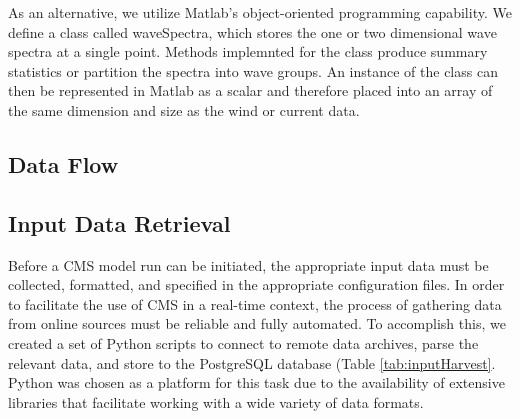 \documentclass[11pt,letterpaper,oneside,reqno]{article}
\begin{document}
As an alternative, we utilize Matlab's object-oriented programming
capability. We define a class called waveSpectra, which stores the
one or two dimensional wave spectra at a single point. Methods
implemnted for the class produce summary statistics or partition
the spectra into wave groups. An instance of the class can then be
represented in Matlab as a scalar and therefore placed into an
array of the same dimension and size as the wind or current data.

\subsection{Data Flow}


\subsection{Input Data Retrieval}

Before a CMS model run can be initiated, the appropriate input data must be collected, formatted, and specified in the appropriate configuration files.  In order to facilitate the use of CMS in a real-time context, the process of gathering data from online sources must be reliable and fully automated.  To accomplish this, we created a set of Python scripts to connect to remote data archives, parse the relevant data, and store to the PostgreSQL database (Table \ref{tab:inputHarvest}.  Python was chosen as a platform for this task due to the availability of extensive libraries that facilitate working with a wide variety of data formats.
\end{document}
